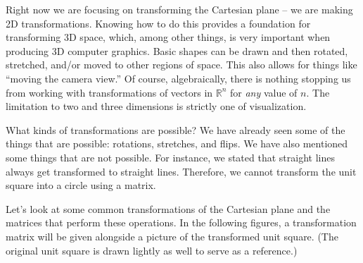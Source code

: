 {\enlargethispage{3\baselineskip}
\begin{myfigure}
\begin{center}
\end{center}
\label{fig:transf_2_2}
\end{myfigure}
\baselineskip}

\medskip

Right now we are focusing on transforming the Cartesian plane -- we are making 2D transformations. Knowing how to do this provides a foundation for transforming 3D space, which, among other things, is very important when producing 3D computer graphics. Basic shapes can be drawn and then rotated, stretched, and/or moved to other regions of space. This also allows for things like ``moving the camera view.'' Of course, algebraically, there is nothing stopping us from working with transformations of vectors in $\mathbb{R}^n$ for \textit{any} value of $n$. The limitation to two and three dimensions is strictly one of visualization.

What kinds of transformations are possible? We have already seen some of the things that are possible: rotations, stretches, and flips. We have also mentioned some things that are not possible. For instance, we stated that straight lines always get transformed to straight lines. Therefore, we cannot transform the unit square into a circle using a matrix.

Let's look at some common transformations of the Cartesian plane and the matrices that perform these operations. In the following figures, a transformation matrix will be given alongside a picture of the transformed unit square. (The original unit square is drawn lightly as well to serve as a reference.)\\

